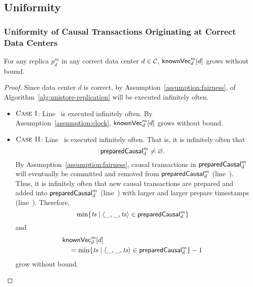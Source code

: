 
\subsection{Uniformity} \label{ss:uniformity}

\subsubsection{Uniformity of Causal Transactions Originating at Correct Data Centers}
\label{sss:uniformity-correct-dc}

\begin{applemma} \label{lemma:knownvc-d-no-bound}
  For any replica $p^{m}_{d}$ in any correct data center $d \in \mathcal{C}$,
  ${\sf knownVec}^{m}_{d}[d]$ grows without bound.
\end{applemma}

\begin{proof} \label{proof:knownvc-d-no-bound}
  Since data center $d$ is correct, by Assumption~\ref{assumption:fairness},
  \propagate{} of Algorithm~\ref{alg:unistore-replication}
  will be executed infinitely often.
  \begin{itemize}
    \item $\textsc{Case I}$:
      Line~\code{\ref{alg:unistore-replication}}{\ref{line:propagate-knownvc-clock}}
      is executed infinitely often.
      By Assumption~\ref{assumption:clock},
      ${\sf knownVec}^{m}_{d}[d]$ grows without bound.
    \item $\textsc{Case II}$:
      Line~\code{\ref{alg:unistore-replication}}{\ref{line:propagate-knownvc-ts}}
      is executed infinitely often.
      That is, it is infinitely often that
      \[
        {\sf preparedCausal}^{m}_{d} \neq \varnothing.
      \]
      By Assumption~\ref{assumption:fairness},
      causal transactions in ${\sf preparedCausal}^{m}_{d}$
      will eventually be committed and removed from ${\sf preparedCausal}^{m}_{d}$
      (line~\code{\ref{alg:unistore-replica}}{\ref{line:commit-preparedcausal}}).
      Thus, it is infinitely often that new causal transactions
      are prepared and added into ${\sf preparedCausal}^{m}_{d}$
      (line~\code{\ref{alg:unistore-replica}}{\ref{line:preparecausal-preparedcausal}})
      with larger and larger prepare timestamps
      (line~\code{\ref{alg:unistore-replica}}{\ref{line:preparecausal-ts}}).
      Therefore,
      \[
        \min\{\mathit{ts} \mid \langle \_, \_, \mathit{ts} \rangle \in {\sf preparedCausal}^{m}_{d}\}
      \]
      and
      \begin{align*}
        &{\sf knownVec}^{m}_{d}[d] \\
          &\quad = \min\{\mathit{ts} \mid \langle \_, \_, \mathit{ts} \rangle \in {\sf preparedCausal}^{m}_{d}\} - 1
      \end{align*}
      grow without bound.
    \end{itemize}
\end{proof}

